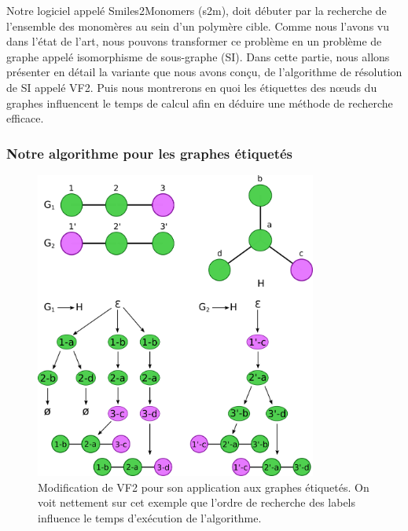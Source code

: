 \label{isomorphisme_p}

Notre logiciel appelé Smiles2Monomers (s2m), doit débuter par la recherche de l'ensemble des monomères au sein d'un polymère cible.
Comme nous l'avons vu dans l'état de l'art, nous pouvons transformer ce problème en un problème de graphe appelé isomorphisme de sous-graphe (SI).
Dans cette partie, nous allons présenter en détail la variante que nous avons conçu, de l'algorithme de résolution de SI appelé VF2.
Puis nous montrerons en quoi les étiquettes des n\oe{}uds du graphes influencent le temps de calcul afin en déduire une méthode de recherche efficace.

\subsubsection{Notre algorithme pour les graphes étiquetés}


\begin{figure}[!ht]
  \begin{center}
    \includegraphics[width=350px]{Figures/s2m/recherche/VF2_labels.png}
    \caption{\label{vf2_labels}Modification de VF2 pour son application aux graphes étiquetés.
    On voit nettement sur cet exemple que l'ordre de recherche des labels influence le temps d'exécution de l'algorithme.}
  \end{center}
\end{figure}

